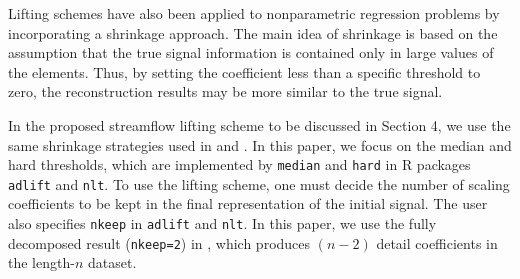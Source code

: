 \documentclass[11pt,titlepage]{article}
\begin{document}
Lifting schemes have also been applied to nonparametric regression problems by incorporating a shrinkage approach. The main idea of shrinkage is based on the assumption that the true signal information is contained only in large values of the  elements. Thus, by setting the coefficient less than a specific threshold to zero, the reconstruction results may be more similar to the true signal.

In the proposed streamflow lifting scheme to be discussed in Section 4, we use the same shrinkage strategies used in \cite{Nunes2006} and \cite{Knight2009}. In this paper, we focus on the median and hard thresholds, which are implemented by  \texttt{median} and \texttt{hard} in R packages \texttt{adlift} and \texttt{nlt}. To use the lifting scheme, one must decide the number of scaling coefficients to be kept in the final representation of the initial signal. The user also specifies \texttt{nkeep} in  \texttt{adlift} and \texttt{nlt}. In this paper, we use the fully decomposed result (\texttt{nkeep=2}) in \cite{Knight2009}, which produces $(n-2)$ detail coefficients in the length-$n$ dataset. 
 
\end{document}
